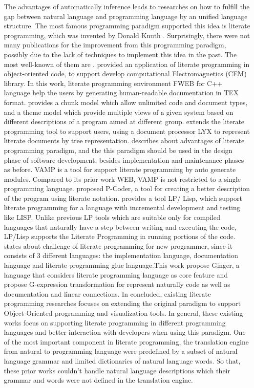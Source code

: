 \documentclass[english]{lipics-v2016}
\begin{document}
The advantages of automatically inference leads to researches on how to fulfill the gap between natural language and programming language by an unified language structure. The most famous programming paradigm supported this idea is literate programming, which was invented by Donald Knuth \cite{p27}. Surprisingly, there were not many publications for the improvement from this programming paradigm, possibly due to the lack of techniques to implement this idea in the past. The most well-known of them are \cite{p6} \cite{p7} \cite{p8} \cite{p9} \cite{p10} \cite{p20} \cite{p21} \cite{p22}.  \cite{p6} provided an application of literate programming in object-oriented code, to support develop computational Electromagnetics (CEM) library. In this work, literate programming environment FWEB for C++ language help the users by generating human-readable documentation in TEX format. \cite{p7} provides a chunk model which allow unlimited code and document types, and a theme model which provide multiple views of a given system based on different descriptions of a program aimed at different group.  \cite{p8} extends the literate programming tool to support users, using a document processor LYX to represent literate documents by tree representation. \cite{p9} describes about advantages of literate programming paradigm, and the this paradigm should be used in the design phase of software development, besides implementation and maintenance phases as before. VAMP \cite{p10} is a tool for support literate programming by auto generate modules. Compared to its prior work WEB, VAMP is not restricted to a single programming language. \cite{p20} proposed P-Coder, a tool for creating a better description of the program using literate notation. \cite{p21} provides a tool LP/ Lisp, which support literate programming for a language with incremental development and testing like LISP. Unlike previous LP tools which are suitable only for compiled languages that naturally have a step between writing and executing the code, LP/Lisp supports the Literate Programming in running portions of the code. \cite{p22} states about challenge of literate programming for new programmer, since it consists of 3 different languages: the implementation language, documentation language and literate programming glue language.This work propose Ginger, a language that considers literate programming language as core feature and propose G-expression transformation for represent naturally code as well as documentation and linear connections. In concluded, existing literate programming researches focuses on extending the original paradigm to support Object-Oriented programming and visualization tools. In general, these existing works focus on supporting literate programming in different programming languages and better interaction with developers when using this paradigm. One of the most important component in literate programming, the translation engine from natural to programming language were predefined by a subset of natural language grammar and limited dictionaries of natural language words.  So that, these prior works couldn't handle natural language descriptions which their grammar and words were not defined in the translation engine.  







\end{document}
